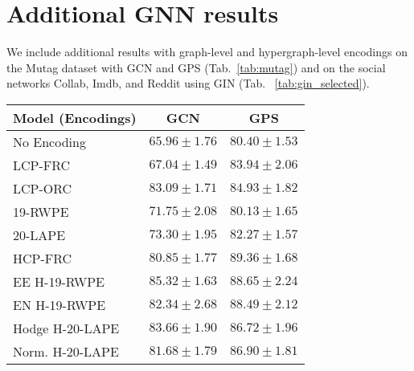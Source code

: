 \section{Additional GNN results}
\label{appendix:additional_results}

We include additional results with graph-level and hypergraph-level encodings on the Mutag dataset with GCN and GPS (Tab.~\ref{tab:mutag}) and on the social networks Collab, Imdb, and Reddit using GIN (Tab.~ \ref{tab:gin_selected}).

\begin{table*}[ht!]
\centering
\footnotesize
\begin{tabular}{|l|c|c|}
\hline
\textbf{Model (Encodings)} & \textbf{GCN} & \textbf{GPS} \\
\hline
No Encoding & $65.96 \pm 1.76$ & $80.40 \pm 1.53$ \\ \hline
LCP-FRC & $67.04 \pm 1.49$ & $83.94 \pm 2.06$ \\
LCP-ORC & $83.09 \pm 1.71$ & $84.93 \pm 1.82$ \\
19-RWPE & $71.75 \pm 2.08$ & $80.13 \pm 1.65$ \\
20-LAPE & $73.30 \pm 1.95$ & $82.27 \pm 1.57$ \\
\hline
HCP-FRC & $80.85 \pm 1.77$ & $\mathbf{89.36 \pm 1.68}$ \\
EE H-19-RWPE & $\mathbf{85.32 \pm 1.63}$ & $88.65 \pm 2.24$ \\
EN H-19-RWPE & $82.34 \pm 2.68$ & $88.49 \pm 2.12$ \\
Hodge H-20-LAPE & $83.66 \pm 1.90$ & $86.72 \pm 1.96$ \\
Norm. H-20-LAPE & $81.68 \pm 1.79$ & $86.90 \pm 1.81$ \\
\hline
\end{tabular}
\caption{GCN and GPS performance on the Mutag dataset with various graph and hypergraph encodings. We report mean and standard deviation across 50 runs.}
\label{tab:mutag}
\end{table*}


